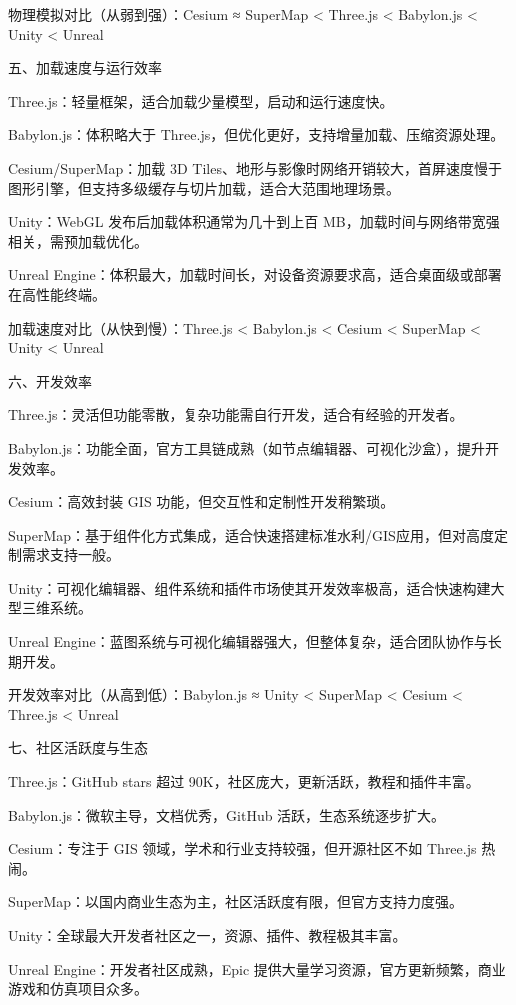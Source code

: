 物理模拟对比（从弱到强）：Cesium ≈ SuperMap \textless{} Three.js \textless{} Babylon.js \textless{} Unity \textless{} Unreal

五、加载速度与运行效率

Three.js：轻量框架，适合加载少量模型，启动和运行速度快。

Babylon.js：体积略大于 Three.js，但优化更好，支持增量加载、压缩资源处理。

Cesium/SuperMap：加载 3D Tiles、地形与影像时网络开销较大，首屏速度慢于图形引擎，但支持多级缓存与切片加载，适合大范围地理场景。

Unity：WebGL 发布后加载体积通常为几十到上百 MB，加载时间与网络带宽强相关，需预加载优化。

Unreal Engine：体积最大，加载时间长，对设备资源要求高，适合桌面级或部署在高性能终端。

加载速度对比（从快到慢）：Three.js \textless{} Babylon.js \textless{} Cesium \textless{} SuperMap \textless{} Unity \textless{} Unreal

六、开发效率

Three.js：灵活但功能零散，复杂功能需自行开发，适合有经验的开发者。

Babylon.js：功能全面，官方工具链成熟（如节点编辑器、可视化沙盒），提升开发效率。

Cesium：高效封装 GIS 功能，但交互性和定制性开发稍繁琐。

SuperMap：基于组件化方式集成，适合快速搭建标准水利/GIS应用，但对高度定制需求支持一般。

Unity：可视化编辑器、组件系统和插件市场使其开发效率极高，适合快速构建大型三维系统。

Unreal Engine：蓝图系统与可视化编辑器强大，但整体复杂，适合团队协作与长期开发。

开发效率对比（从高到低）：Babylon.js ≈ Unity \textless{} SuperMap \textless{} Cesium \textless{} Three.js \textless{} Unreal

七、社区活跃度与生态

Three.js：GitHub stars 超过 90K，社区庞大，更新活跃，教程和插件丰富。

Babylon.js：微软主导，文档优秀，GitHub 活跃，生态系统逐步扩大。

Cesium：专注于 GIS 领域，学术和行业支持较强，但开源社区不如 Three.js 热闹。

SuperMap：以国内商业生态为主，社区活跃度有限，但官方支持力度强。

Unity：全球最大开发者社区之一，资源、插件、教程极其丰富。

Unreal Engine：开发者社区成熟，Epic 提供大量学习资源，官方更新频繁，商业游戏和仿真项目众多。

